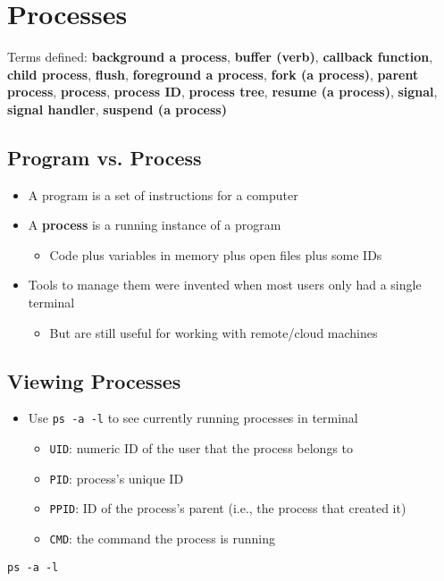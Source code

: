 \documentclass[krantzl]{krantz}
\newcommand{\glossref}[1]{\textbf{#1}}
\begin{document}
\chapter{Processes}\label{process}




Terms defined: 
\glossref{background a process}, \glossref{buffer (verb)}, \glossref{callback function}, \glossref{child process}, \glossref{flush}, \glossref{foreground a process}, \glossref{fork (a process)}, \glossref{parent process}, \glossref{process}, \glossref{process ID}, \glossref{process tree}, \glossref{resume (a process)}, \glossref{signal}, \glossref{signal handler}, \glossref{suspend (a process)}


\section{Program vs. Process}
\begin{itemize}
\item A program is a set of instructions for a computer

\item A \glossref{process} is a running instance of a program\begin{itemize}
\item Code plus variables in memory plus open files plus some IDs

\end{itemize}


\item Tools to manage them were invented when most users only had a single terminal\begin{itemize}
\item But are still useful for working with remote/cloud machines

\end{itemize}


\end{itemize}
\section{Viewing Processes}
\begin{itemize}
\item Use \texttt{ps -a -l} to see currently running processes in terminal\begin{itemize}
\item \texttt{UID}: numeric ID of the user that the process belongs to

\item \texttt{PID}: process’s unique ID

\item \texttt{PPID}: ID of the process’s parent (i.e., the process that created it)

\item \texttt{CMD}: the command the process is running

\end{itemize}


\end{itemize}
\begin{lstlisting}[frame=tblr]
ps -a -l
\end{lstlisting}
\end{document}
